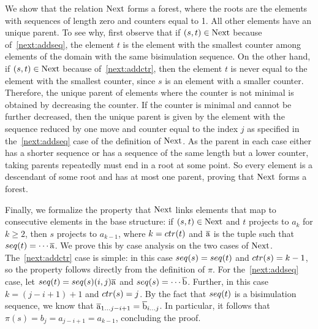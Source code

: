 {We show that the relation $\mathrm{Next}$ forms a forest, where the roots are the elements with sequences of length zero and counters equal to 1.
All other elements have an unique parent.
To see why, first observe that if $(s, t) \in \mathrm{Next}$ because of~\ref{next:addseq}, the element $t$ is the element with the smallest counter among elements of the domain with the same bisimulation sequence.
On the other hand, if $(s, t) \in \mathrm{Next}$ because of~\ref{next:addctr}, then the element $t$ is never equal to the element with the smallest counter, since $s$ is an element with a smaller counter.
Therefore, the unique parent of elements where the counter is not minimal is obtained by decreasing the counter.
If the counter is minimal and cannot be further decreased, then the unique parent is given by the element with the sequence reduced by one move and counter equal to the index $j$ as specified in the~\ref{next:addseq} case of the definition of $\mathrm{Next}$.
As the parent in each case either has a shorter sequence or has a sequence of the same length but a lower counter, taking parents repeatedly must end in a root at some point.
So every element is a descendant of some root and has at most one parent, proving that $\mathrm{Next}$ forms a forest.

Finally, we formalize the property that $\mathrm{Next}$ links elements that map to consecutive elements in the base structure: if $(s,t) \in \mathrm{Next}$ and $t$ projects to $a_{k}$ for $k \ge 2$, then $s$ projects to $a_{k-1}$, where $k = \ctr{t}$ and $\overline{\mathrm{a}}$ is the tuple such that $\seq{t} = \cdots \elemtuplea$.
We prove this by case analysis on the two cases of $\mathrm{Next}$.
The~\ref{next:addctr} case is simple: in this case $\seq{s} = \seq{t}$ and $\ctr{s} = k - 1$, so the property follows directly from the definition of $\pi$.
For the~\ref{next:addseq} case, let $\seq{t} = \seq{s} (i,j) \elemtuplea$ and $\seq{s} = \cdots \elemtupleb$.
Further, in this case $k = (j - i + 1) + 1$ and $\ctr{s} = j$.
By the fact that $\seq{t}$ is a bisimulation sequence, we know that $\overline{\mathrm{a}}_{1\ldots j-i+1} = \overline{\mathrm{b}}_{i\ldots j}$.
In particular, it follows that $\pi(s) = b_{j} = a_{j-i+1} = a_{k-1}$, concluding the proof.

}
